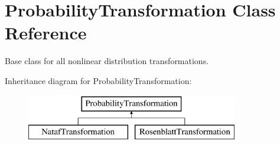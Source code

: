 \section{Probability\+Transformation Class Reference}
\label{classPecos_1_1ProbabilityTransformation}


Base class for all nonlinear distribution transformations.  


Inheritance diagram for Probability\+Transformation\+:\begin{figure}[H]
\begin{center}
\leavevmode
\includegraphics[height=2.000000cm]{classPecos_1_1ProbabilityTransformation}
\end{center}
\end{figure}
